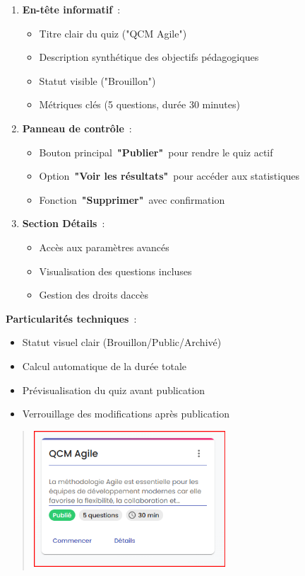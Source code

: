 \documentclass[12pt,a4paper,twoside,openright]{report}
\begin{document}
\begin{enumerate}
\def\labelenumi{\arabic{enumi}.}
\item
  \textbf{En-tête informatif}~:

  \begin{itemize}
  \item
    Titre clair du quiz ("QCM Agile")
  \item
    Description synthétique des objectifs pédagogiques
  \item
    Statut visible ("Brouillon")
  \item
    Métriques clés (5 questions, durée 30 minutes)
  \end{itemize}
\item
  \textbf{Panneau de contrôle}~:

  \begin{itemize}
  \item
    Bouton principal~\textbf{"Publier"}~pour rendre le quiz actif
  \item
    Option~\textbf{"Voir les résultats"}~pour accéder aux statistiques
  \item
    Fonction~\textbf{"Supprimer"}~avec confirmation
  \end{itemize}
\item
  \textbf{Section Détails}~:

  \begin{itemize}
  \item
    Accès aux paramètres avancés
  \item
    Visualisation des questions incluses
  \item
    Gestion des droits d\textquotesingle accès
  \end{itemize}
\end{enumerate}

\textbf{Particularités techniques}~:

\begin{itemize}
\item
  Statut visuel clair (Brouillon/Public/Archivé)
\item
  Calcul automatique de la durée totale
\item
  Prévisualisation du quiz avant publication
\item
  Verrouillage des modifications après publication
\end{itemize}

\begin{quote}
\includegraphics[width=2.82639in,height=2.00694in]{latex_media/media/image58.png}
\end{quote}
\end{document}

